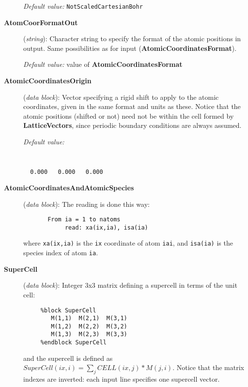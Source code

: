 \begin{description}
{\it Default value:} {\tt NotScaledCartesianBohr}


\item[{\bf AtomCoorFormatOut}] ({\it string}): 
Character string to specify the format of the atomic positions in output.
Same possibilities as for input ({\bf AtomicCoordinatesFormat}).

{\it Default value:} value of {\bf AtomicCoordinatesFormat}


\item[{\bf AtomicCoordinatesOrigin}] ({\it data block}): 
Vector specifying a rigid shift to apply to the atomic coordinates,
given in the same format and units as these. Notice that the atomic
positions (shifted or not) need not be within the cell formed by
{\bf LatticeVectors}, since periodic boundary conditions are always
assumed.

{\it Default value:} 
{\tt
\begin{verbatim}
  0.000   0.000   0.000
\end{verbatim}
}


\item[{\bf AtomicCoordinatesAndAtomicSpecies}] ({\it data block}): 
The reading is done this way:
\begin{verbatim}
       From ia = 1 to natoms
            read: xa(ix,ia), isa(ia)
\end{verbatim}
where {\tt xa(ix,ia)} is the {\tt ix} coordinate of atom 
{\tt iai}, and {\tt isa(ia)} is the species index of atom {\tt ia}.


\item[{\bf SuperCell}] ({\it data block}): 
Integer 3x3 matrix defining a supercell in terms of the unit cell: 

\begin{verbatim}
     %block SuperCell
        M(1,1)  M(2,1)  M(3,1) 
        M(1,2)  M(2,2)  M(3,2) 
        M(1,3)  M(2,3)  M(3,3) 
     %endblock SuperCell
\end{verbatim}

and the supercell is defined as
$SuperCell(ix,i) = \sum_j CELL(ix,j)*M(j,i)$.
Notice that the matrix indexes are inverted: each input line 
specifies one supercell vector.


\end{description}
